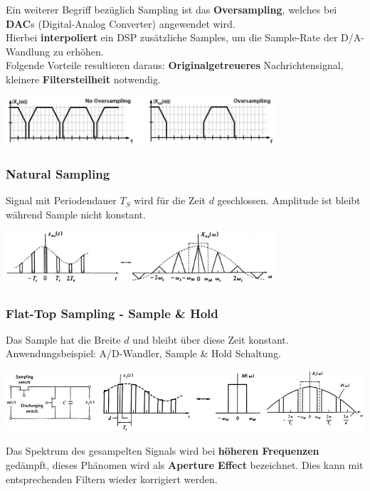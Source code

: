 Ein weiterer Begriff bezüglich Sampling ist das \textbf{Oversampling}, welches bei \textbf{DAC}s
(Digital-Analog Converter) angewendet wird. \\
Hierbei \textbf{interpoliert} ein DSP zusätzliche Samples, um die Sample-Rate der D/A-Wandlung zu
erhöhen.\\
Folgende Vorteile resultieren daraus: \textbf{Originalgetreueres} Nachrichtensignal, kleinere
\textbf{Filtersteilheit} notwendig.
	\begin{center}
		\includegraphics[width=10cm]{bilder/dig_oversampling.png}
	\end{center}

\subsubsection{Natural Sampling}
Signal mit Periodendauer $T_S$ wird für die Zeit $d$ geschlossen. Amplitude ist bleibt
während Sample nicht konstant. \\

	\begin{center}
		\includegraphics[width=10cm]{bilder/dig_naturalsampling.png}
	\end{center}

\subsubsection{Flat-Top Sampling - Sample \& Hold}
Das Sample hat die Breite $d$ und bleibt über diese Zeit konstant. \\
Anwendungsbeispiel: A/D-Wandler, Sample \& Hold Schaltung. \\
	\begin{center}
		\includegraphics[width=17.5cm]{bilder/dig_flattopsampling.png}
	\end{center}
Das Spektrum des gesampelten Signals wird bei \textbf{höheren Frequenzen} gedämpft, dieses Phänomen
wird als \textbf{Aperture Effect} bezeichnet. Dies kann mit entsprechenden Filtern wieder
korrigiert werden.\\

